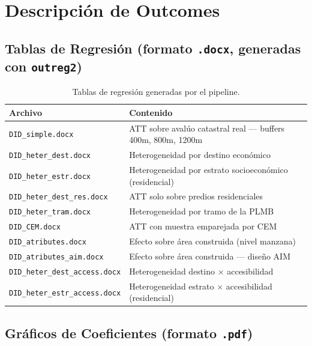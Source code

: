 \documentclass[12pt, a4paper]{article}
\begin{document}
\section{Descripción de Outcomes}

\subsection{Tablas de Regresión (formato \texttt{.docx}, generadas con \texttt{outreg2})}

\begin{table}[h!]
\centering
\begin{tabular}{@{}L{5cm} L{9.5cm}@{}}
\toprule
\textbf{Archivo} & \textbf{Contenido} \\
\midrule
\texttt{DID\_simple.docx} & ATT sobre avalúo catastral real — buffers 400m, 800m, 1200m \\
\texttt{DID\_heter\_dest.docx} & Heterogeneidad por destino económico \\
\texttt{DID\_heter\_estr.docx} & Heterogeneidad por estrato socioeconómico (residencial) \\
\texttt{DID\_heter\_dest\_res.docx} & ATT solo sobre predios residenciales \\
\texttt{DID\_heter\_tram.docx} & Heterogeneidad por tramo de la PLMB \\
\texttt{DID\_CEM.docx} & ATT con muestra emparejada por CEM \\
\texttt{DID\_atributes.docx} & Efecto sobre área construida (nivel manzana) \\
\texttt{DID\_atributes\_aim.docx} & Efecto sobre área construida — diseño AIM \\
\texttt{DID\_heter\_dest\_access.docx} & Heterogeneidad destino $\times$ accesibilidad \\
\texttt{DID\_heter\_estr\_access.docx} & Heterogeneidad estrato $\times$ accesibilidad (residencial) \\
\bottomrule
\end{tabular}
\caption{Tablas de regresión generadas por el pipeline.}
\end{table}

\newpage

\subsection{Gráficos de Coeficientes (formato \texttt{.pdf})}
\end{document}
